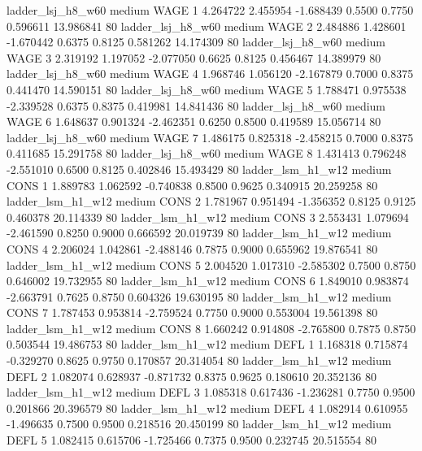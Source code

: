      ladder_lsj_h8_w60     medium     WAGE                 1  4.264722 2.455954 -1.688439 0.5500 0.7750  0.596611   13.986841 80
     ladder_lsj_h8_w60     medium     WAGE                 2  2.484886 1.428601 -1.670442 0.6375 0.8125  0.581262   14.174309 80
     ladder_lsj_h8_w60     medium     WAGE                 3  2.319192 1.197052 -2.077050 0.6625 0.8125  0.456467   14.389979 80
     ladder_lsj_h8_w60     medium     WAGE                 4  1.968746 1.056120 -2.167879 0.7000 0.8375  0.441470   14.590151 80
     ladder_lsj_h8_w60     medium     WAGE                 5  1.788471 0.975538 -2.339528 0.6375 0.8375  0.419981   14.841436 80
     ladder_lsj_h8_w60     medium     WAGE                 6  1.648637 0.901324 -2.462351 0.6250 0.8500  0.419589   15.056714 80
     ladder_lsj_h8_w60     medium     WAGE                 7  1.486175 0.825318 -2.458215 0.7000 0.8375  0.411685   15.291758 80
     ladder_lsj_h8_w60     medium     WAGE                 8  1.431413 0.796248 -2.551010 0.6500 0.8125  0.402846   15.493429 80
     ladder_lsm_h1_w12     medium     CONS                 1  1.889783 1.062592 -0.740838 0.8500 0.9625  0.340915   20.259258 80
     ladder_lsm_h1_w12     medium     CONS                 2  1.781967 0.951494 -1.356352 0.8125 0.9125  0.460378   20.114339 80
     ladder_lsm_h1_w12     medium     CONS                 3  2.553431 1.079694 -2.461590 0.8250 0.9000  0.666592   20.019739 80
     ladder_lsm_h1_w12     medium     CONS                 4  2.206024 1.042861 -2.488146 0.7875 0.9000  0.655962   19.876541 80
     ladder_lsm_h1_w12     medium     CONS                 5  2.004520 1.017310 -2.585302 0.7500 0.8750  0.646002   19.732955 80
     ladder_lsm_h1_w12     medium     CONS                 6  1.849010 0.983874 -2.663791 0.7625 0.8750  0.604326   19.630195 80
     ladder_lsm_h1_w12     medium     CONS                 7  1.787453 0.953814 -2.759524 0.7750 0.9000  0.553004   19.561398 80
     ladder_lsm_h1_w12     medium     CONS                 8  1.660242 0.914808 -2.765800 0.7875 0.8750  0.503544   19.486753 80
     ladder_lsm_h1_w12     medium     DEFL                 1  1.168318 0.715874 -0.329270 0.8625 0.9750  0.170857   20.314054 80
     ladder_lsm_h1_w12     medium     DEFL                 2  1.082074 0.628937 -0.871732 0.8375 0.9625  0.180610   20.352136 80
     ladder_lsm_h1_w12     medium     DEFL                 3  1.085318 0.617436 -1.236281 0.7750 0.9500  0.201866   20.396579 80
     ladder_lsm_h1_w12     medium     DEFL                 4  1.082914 0.610955 -1.496635 0.7500 0.9500  0.218516   20.450199 80
     ladder_lsm_h1_w12     medium     DEFL                 5  1.082415 0.615706 -1.725466 0.7375 0.9500  0.232745   20.515554 80
